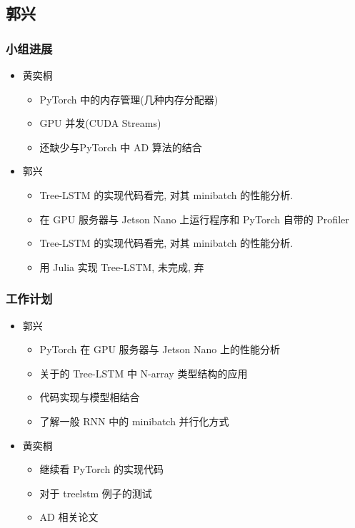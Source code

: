 \subsection{郭兴}

\subsubsection{小组进展}

\begin{itemize}
	\item
	      黄奕桐
	      \begin{itemize}
		      \item
		            PyTorch 中的内存管理(几种内存分配器)
		      \item
		            GPU 并发(CUDA Streams)
		      \item
		            还缺少与PyTorch 中 AD 算法的结合
	      \end{itemize}

	\item
	      郭兴
	      \begin{itemize}
		      \item
		            Tree-LSTM 的实现代码看完, 对其 minibatch 的性能分析.
		      \item
		            在 GPU 服务器与 Jetson Nano 上运行程序和 PyTorch 自带的 Profiler
		      \item
		            Tree-LSTM 的实现代码看完, 对其 minibatch 的性能分析.
		      \item
		            用 Julia 实现 Tree-LSTM, 未完成, 弃
	      \end{itemize}
\end{itemize}

\subsubsection{工作计划}

\begin{itemize}
	\item
	      郭兴
	      \begin{itemize}

		      \item
		            PyTorch 在 GPU 服务器与 Jetson Nano 上的性能分析
		      \item
		            关于的 Tree-LSTM 中 N-array 类型结构的应用
		      \item
		            代码实现与模型相结合
		      \item
		            了解一般 RNN 中的 minibatch 并行化方式
	      \end{itemize}
	\item
	      黄奕桐
	      \begin{itemize}
		      \item
		            继续看 PyTorch 的实现代码
		      \item
		            对于 treelstm 例子的测试
		      \item
		            AD 相关论文
	      \end{itemize}
\end{itemize}

